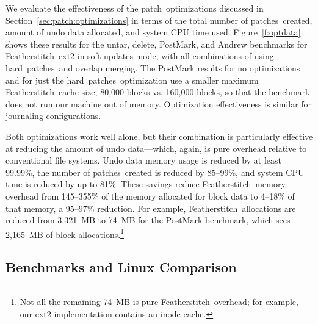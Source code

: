 \documentclass[9pt,twocolumn,letterpaper]{article}
\newcommand{\Kudos}{Featherstitch}
\newcommand{\Featherstitch}{\Kudos}
\newcommand{\patch}{patch}
\newcommand{\patches}{patches}
\newcommand{\nrb}{hard}
\newcommand{\rb}{soft}
\newcommand{\Rb}{Soft}
\newcommand{\patchoptcount}{85--99\%}
\newcommand{\patchoptundo}{at least 99.99\%}
\begin{document}
\opttable{}

We evaluate the effectiveness of the \patch\ optimizations discussed in
Section~\ref{sec:patch:optimizations} in terms of
%
the total number of \patches\ created, amount of undo data allocated,
and system CPU time used.
%
Figure~\ref{f:optdata} shows these results for the untar, delete,
PostMark, and Andrew benchmarks for \Kudos\ ext2 in soft updates mode,
with all combinations of using \nrb\ \patches\ and overlap merging.
%
The PostMark results for no optimizations and for just the \nrb\
\patches\ optimization use a smaller maximum \Kudos\ cache size,
80,000 blocks vs. 160,000 blocks, so that the benchmark does not run
our machine out of memory.
%
Optimization effectiveness is similar for journaling configurations.

Both optimizations work well alone, but their combination is particularly
effective at reducing the amount of undo data---which, again, is pure
overhead relative to conventional file systems.
%
Undo data memory usage is reduced by \patchoptundo,
%
the number of \patches\ created is reduced by \patchoptcount,
%
and system CPU time is reduced by up to 81\%.
%
These savings reduce \Kudos\ memory overhead
%
from 145--355\% of the memory allocated for block data
to 4--18\% of that memory, a 95--97\% reduction. For
example, \Kudos\ allocations are reduced from 3,321~MB to 74~MB for
the PostMark benchmark, which sees 2,165~MB of block
allocations.\footnote{Not all the remaining 74~MB is pure \Featherstitch\
overhead; for example, our ext2 implementation contains an inode cache.}


\begin{comment}
\begin{figure}[t]
\vspace{-0.5\baselineskip}
\centering{
\texttt{[image: rb\_patch\_size]}
}
\vspace{-0.5\baselineskip}
\caption{\label{fig:patchsize-histo} \Rb\ \patch\ size histogram for a sample
workload (extracting a large archive into ext2). All the \patches\ larger than
63 bytes have been optimized into \nrb\ \patches. \Rb\ \patches\ 4 bytes and
smaller account for about 51\% of all \rb\ \patches.}
\end{figure}
\end{comment}

\subsection{Benchmarks and Linux Comparison}
\label{sec:eval:bench}
\end{document}
